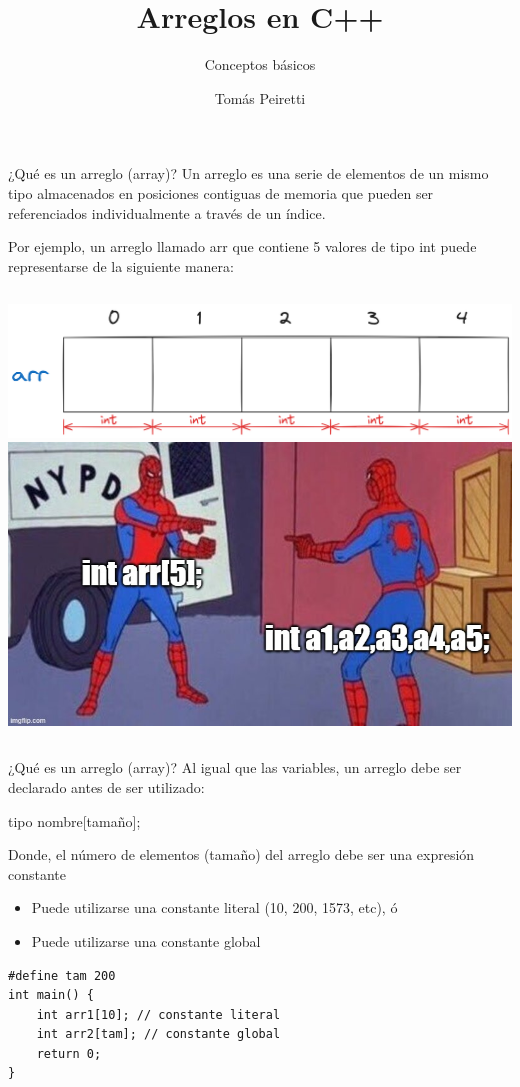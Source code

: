 \documentclass[12pt]{beamer}
\title{Arreglos en C++}
\subtitle{Conceptos básicos}
\author{Tomás Peiretti}
\date{}
\begin{document}
\maketitle

\begin{frame}{¿Qué es un arreglo (array)?}
    Un arreglo es una \alert{serie de elementos de un mismo tipo} almacenados en posiciones contiguas de memoria que pueden ser referenciados individualmente a través de un índice.

    \medskip

    Por ejemplo, un arreglo llamado \alert{arr} que contiene 5 valores de tipo \alert{int} puede representarse de la siguiente manera:

    \medskip
    \begin{columns}
        \includegraphics[width=\textwidth]{array1.png}
        \includegraphics[width=\textwidth]{meme.jpg}
    \end{columns}
\end{frame}

\begin{frame}[fragile]{¿Qué es un arreglo (array)?}
    Al igual que las variables, un arreglo debe ser declarado antes de ser utilizado:
    \begin{center}
        \alert{tipo} nombre[tamaño];
    \end{center}

    Donde, el número de elementos (tamaño) del arreglo debe ser una expresión constante
    \begin{itemize}
        \item Puede utilizarse una constante literal (10, 200, 1573, etc), ó
        \item Puede utilizarse una constante global
    \end{itemize}
\begin{lstlisting}
#define tam 200
int main() {
    int arr1[10]; // constante literal
    int arr2[tam]; // constante global
    return 0;
}
\end{lstlisting}
\end{frame}
\end{document}
